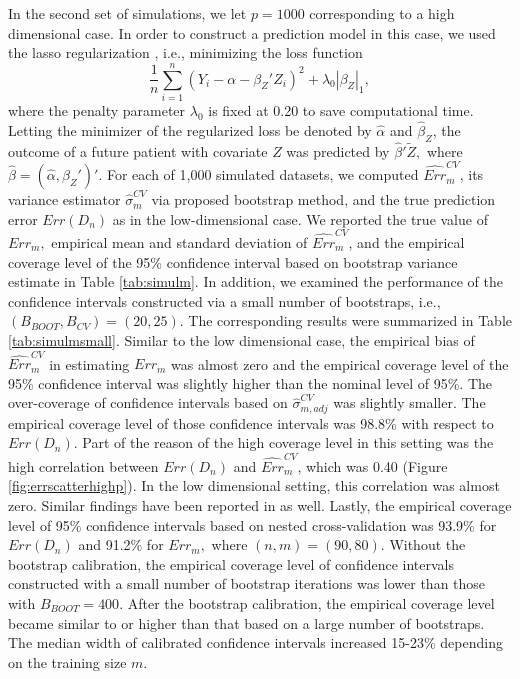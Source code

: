 \documentclass[12pt]{article}
\begin{document}
In the second set of simulations,  we let $p=1000$ corresponding to a high dimensional case.  In order to construct a prediction model in this case, we used the lasso regularization \cite{tibshirani1996regression}, i.e., minimizing the loss function
$$ \frac{1}{n}\sum_{i=1}^n (Y_i-\alpha-\beta_Z'Z_i)^2+\lambda_0|\beta_Z|_1, $$
where the penalty parameter $\lambda_0$ is fixed at 0.20 to save computational time. 
Letting the minimizer of the regularized loss be denoted by $\hat{\alpha}$ and $\hat{\beta}_Z$, the outcome of a future patient with covariate $Z$ was predicted by $\hat{\beta}'\tilde{Z},$ where $\hat{\beta}=(\hat{\alpha}, \hat{\beta}_Z')'.$ For each of 1,000 simulated datasets, we computed  $\widehat{Err}_m^{CV}$, its variance estimator $\hat{\sigma}_m^{CV}$ via proposed bootstrap method, and the true prediction error $Err(D_n)$ as in the low-dimensional case.  We reported the true value of $Err_m,$ empirical mean and standard deviation of $\widehat{Err}_m^{CV}$, and the empirical coverage level of the 95\% confidence interval based on bootstrap variance estimate in Table \ref{tab:simulm}. In addition, we examined the performance of the confidence intervals constructed via a small number of bootstraps, i.e., $(B_{BOOT}, B_{CV})=(20, 25).$ The corresponding results were summarized in Table \ref{tab:simulmsmall}. Similar to the low dimensional case, the empirical bias of $\widehat{Err}_m^{CV}$ in estimating $Err_m$ was almost zero and the empirical coverage level of the 95\% confidence interval was slightly higher than the nominal level of 95\%. The over-coverage of confidence intervals based on $\widehat{\sigma}_{m, adj}^{CV}$ was slightly smaller. The empirical coverage level of those confidence intervals was 98.8\% with respect to $Err(D_n).$ Part of the reason of the high coverage level in this setting was the high correlation between $Err(D_n)$ and $\widehat{Err}_m^{CV}$, which was 0.40 (Figure \ref{fig:errscatterhighp}).  In the low dimensional setting, this correlation was almost zero. Similar findings have been reported in \cite{bates2021cross} as well. Lastly, the empirical coverage level of 95\% confidence intervals based on nested cross-validation was 93.9\% for $Err(D_n)$ and 91.2\% for $Err_m,$ where $(n, m)=(90, 80).$   Without the bootstrap calibration, the empirical coverage level of confidence intervals constructed with a small number of bootstrap iterations was lower than those with $B_{BOOT}=400.$ After the bootstrap calibration, the empirical coverage level became similar to or higher than that based on a large number of bootstraps. The median width of calibrated confidence intervals increased 15-23\% depending on the training size $m.$
\end{document}
